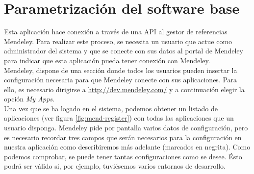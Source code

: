


\section{Parametrización del software base}
Esta aplicación hace conexión a través de una API al gestor de referencias Mendeley. Para realizar este proceso, se necesita un usuario que actue como administrador del sistema y que se conecte con sus datos al portal de Mendeley para indicar que esta aplicación pueda tener conexión con Mendeley.\\

Mendeley, dispone de una sección donde todos los usuarios pueden insertar la configuración necesaria para que Mendeley conecte con sus aplicaciones. Para ello, es necesario dirigirse a \url{http://dev.mendeley.com/} y a continuación elegir la opción \textit{My Apps}.\\

Una vez que se ha logado en el sistema, podemos obtener un listado de aplicaciones (ver figura \ref{fig:mend-register}) con todas las aplicaciones que un usuario disponga. Mendeley pide por pantalla varios datos de configuración, pero es necesario recordar tres campos que serán necesarios para la configuración en nuestra aplicación como describiremos más adelante (marcados en negrita). Como podemos comprobar, se puede tener tantas configuraciones como se desee. Ésto podrá ser válido si, por ejemplo, tuviésemos varios entornos de desarrollo.


